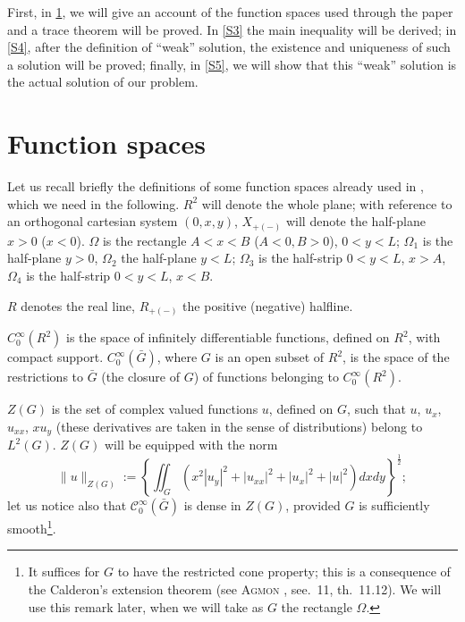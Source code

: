 \documentclass[a4paper,12pt,leqno]{article}
\numberwithin{equation}{section}
\begin{document}
First, in \cref{S2}, we will give an account of the function spaces used through the paper and a trace theorem will be proved. In \cref{S3} the main inequality will be derived; in \cref{S4}, after the definition of ``weak'' solution, the existence and uniqueness of such a solution will be proved; finally, in \cref{S5}, we will show that this ``weak'' solution is the actual solution of our problem.

\section{Function spaces} \label{S2}

Let us recall briefly the definitions of some function spaces already used in \cite{zbMATH03479447}, which we need in the following. $R^{2}$ will denote the whole plane; with reference to an orthogonal cartesian system $(0, x, y)$, $X_{+(-)}$ will denote the half-plane $x>0$ ($x<0$). $\Omega$ is the rectangle $A<x<B$ ($A<0, B>0$), $0<y<L$; $\Omega_{1}$ is the half-plane $y>0$, $\Omega_{2}$ the half-plane $y<L$; $\Omega_{3}$ is the half-strip $0<y<L$, $x>A$, $\Omega_{4}$ is the half-strip $0<y<L$, $x<B$.

$R$ denotes the real line, $R_{+(-)}$ the positive (negative) halfline. 

$C_{0}^{\infty}\left(R^{2}\right)$ is the space of infinitely differentiable functions, defined on $R^{2}$, with compact support. $C_{0}^\infty(\bar{G})$, where $G$ is an open subset of $R^{2}$, is the space of the restrictions to $\bar{G}$ (the closure of $G$) of functions belonging to $C_{0}^{\infty}\left(R^{2}\right)$.

$Z(G)$ is the set of complex valued functions $u$, defined on $G$, such that $u$, $u_{x}$, $u_{xx}$, $x u_{y}$ (these derivatives are taken in the sense of distributions) belong to $L^{2}(G)$. $Z(G)$ will be equipped with the norm
\begin{equation}
	\|u\|_{Z(G)}:= \left\{ 
	\iint_G \left(
	x^2 |u_y|^2 + |u_{xx}|^2 + |u_x|^2 + |u|^2
	\right) dx dy
	\right\}^{\frac 1 2};
\end{equation}
let us notice also that $\mathcal{C}_{0}^{\infty}(\bar{G})$ is dense in $Z(G)$, provided $G$ is sufficiently smooth\footnote{It suffices for $G$ to have the restricted cone property; this is a consequence of the Calderon's extension theorem (see \textsc{Agmon} \cite{zbMATH03229907}, see.\ 11, th.\ 11.12). We will use this remark later, when we will take as $G$ the rectangle $\Omega$.}.
\end{document}
